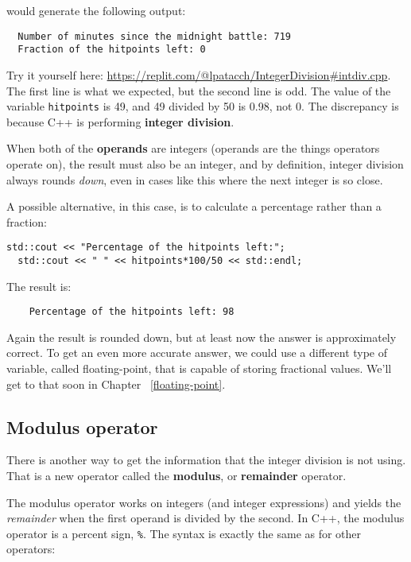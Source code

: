 would generate the following output:

\begin{verbatim}
  Number of minutes since the midnight battle: 719
  Fraction of the hitpoints left: 0
\end{verbatim}
%
Try it yourself here: \url{https://replit.com/@lpatacch/IntegerDivision#intdiv.cpp}.
The first line is what we expected, but the second line is
odd.  The value of the variable {\tt hitpoints} is 49, and
49 divided by 50 is 0.98, not 0.  The discrepancy is because
C++ is performing {\bf integer division}.


When both of the {\bf operands} are integers (operands are the things
operators operate on), the result must also be an integer,
and by definition, integer division always rounds {\em down},
even in cases like this where the next integer is so close.

A possible alternative, in this case, is to calculate a percentage
rather than a fraction:

\begin{lstlisting}[frame=single]
  std::cout << "Percentage of the hitpoints left:";
  std::cout << " " << hitpoints*100/50 << std::endl;
\end{lstlisting}

%
The result is:

\begin{verbatim}
    Percentage of the hitpoints left: 98
\end{verbatim}
%
Again the result is rounded down, but at least now the answer
is approximately correct.  To get an even more accurate
answer, we could use a different type of variable, called
floating-point, that is capable of storing fractional values.
We'll get to that soon in Chapter ~\ref{floating-point}.

\subsection{Modulus operator}
\label{modulus}
There is another way to get the information that the integer division is not using. That is a new operator called the {\bf modulus}, or {\bf remainder} operator.

The modulus operator works on integers (and integer expressions)
and yields the {\em remainder} when the first operand is divided
by the second.  In C++, the modulus operator is a percent sign,
{\tt \%}.  The syntax is exactly the same as for other operators:

